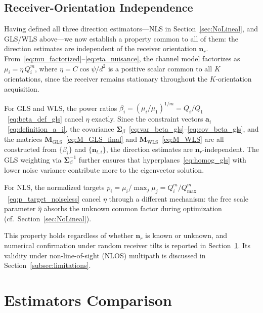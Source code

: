 \documentclass[journal]{IEEEtran}
\begin{document}
\subsection{Receiver-Orientation Independence}
\label{subsec:nr_independence}
Having defined all three direction estimators---NLS in Section~\ref{sec:NoLineal}, and GLS/WLS above---we now establish a property common to all of them: the direction estimates are independent of the receiver orientation $\mathbf{n}_r$. From~\eqref{eq:mu_factorized}--\eqref{eq:eta_nuisance}, the channel model factorizes as $\mu_i = \eta\,Q_i^m$, where $\eta = C\cos\psi/d^2$ is a positive scalar common to all $K$ orientations, since the receiver remains stationary throughout the $K$-orientation acquisition.

For GLS and WLS, the power ratios $\beta_i = (\mu_i/\mu_1)^{1/m} = Q_i/Q_1$~\eqref{eq:beta_def_gls} cancel $\eta$ exactly. Since the constraint vectors $\mathbf{a}_i$~\eqref{eq:definition_a_i}, the covariance $\mathbf{\Sigma}_\beta$~\eqref{eq:var_beta_gls}--\eqref{eq:cov_beta_gls}, and the matrices $\mathbf{M}_{\mathrm{GLS}}$~\eqref{eq:M_GLS_final} and $\mathbf{M}_{\mathrm{WLS}}$~\eqref{eq:M_WLS} are all constructed from $\{\beta_i\}$ and $\{\mathbf{n}_{t,i}\}$, the direction estimates are $\mathbf{n}_r$-independent. The GLS weighting via $\mathbf{\Sigma}_\beta^{-1}$ further ensures that hyperplanes~\eqref{eq:homog_gls} with lower noise variance contribute more to the eigenvector solution.

For NLS, the normalized targets $p_i = \mu_i/\max_j\mu_j = Q_i^m/Q_{\max}^m$~\eqref{eq:p_target_noiseless} cancel $\eta$ through a different mechanism: the free scale parameter $\hat\eta$ absorbs the unknown common factor during optimization (cf.\ Section~\ref{sec:NoLineal}).

This property holds regardless of whether $\mathbf{n}_r$ is known or unknown, and numerical confirmation under random receiver tilts is reported in Section~\ref{sec:results}. Its validity under non-line-of-sight (NLOS) multipath is discussed in Section~\ref{subsec:limitations}.


\section{Estimators Comparison}
\label{sec:results}
\end{document}
